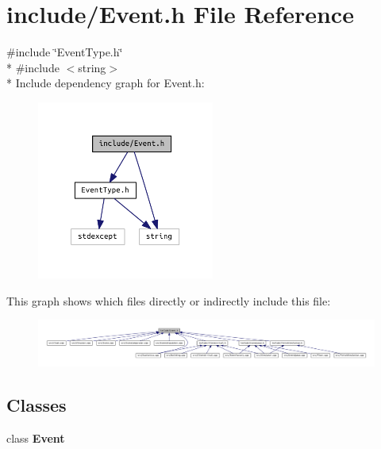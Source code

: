 \section{include/\+Event.h File Reference}
\label{_event_8h}
{\ttfamily \#include \char`\"{}Event\+Type.\+h\char`\"{}}\\*
{\ttfamily \#include $<$string$>$}\\*
Include dependency graph for Event.\+h\+:\nopagebreak
\begin{figure}[H]
\begin{center}
\leavevmode
\includegraphics[width=165pt]{_event_8h__incl}
\end{center}
\end{figure}
This graph shows which files directly or indirectly include this file\+:\nopagebreak
\begin{figure}[H]
\begin{center}
\leavevmode
\includegraphics[width=350pt]{_event_8h__dep__incl}
\end{center}
\end{figure}
\subsection*{Classes}
\begin{DoxyCompactItemize}
\item 
class {\bf Event}
\end{DoxyCompactItemize}

